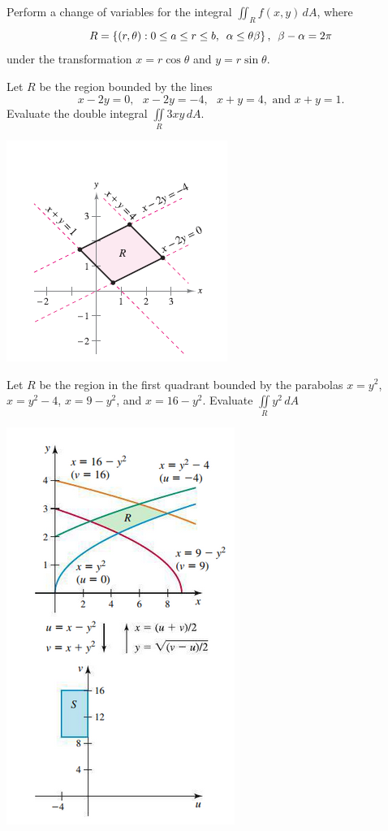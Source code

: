\documentclass[../mathNotesPreamble]{subfiles}
\begin{document}
  \begin{ex*}
    Perform a change of variables for the integral $\displaystyle\iint_Rf(x,y)\,dA$, where 
    \[
      R=\left\{{\left(r,\theta\right)}: 0\leq a\leq r\leq b,\hspace{5pt} \alpha\leq\theta\beta\right\},\hspace{5pt} \beta-\alpha=2\pi
    \] 
    under the transformation $x=r\cos\theta$ and $y=r\sin\theta$.
  \end{ex*}
  \pagebreak

  \begin{ex*}
    Let $R$ be the region bounded by the lines 
    \[
      x-2y=0,\text{ }x-2y=-4,\text{ }x+y=4,\text{ and }x+y=1.
    \]
    Evaluate the double integral $\displaystyle\iint\limits_R3xy\,dA$.
  \end{ex*}
  \begin{flushleft}
    \includegraphics[width=.35\linewidth]{../images/briggs_16_07/fig16_420}
  \end{flushleft}
  \pagebreak

  \begin{ex*}
    Let $R$ be the region in the first quadrant bounded by the parabolas $x=y^2$, $x=y^2-4$, $x=9-y^2$, and $x=16-y^2$. Evaluate $\displaystyle\iint\limits_R y^2\,dA$
  \end{ex*}
  \begin{flushleft}
    \includegraphics[width=.35\linewidth]{../images/briggs_16_07/fig16_22}
  \end{flushleft}
  \pagebreak
\end{document}
